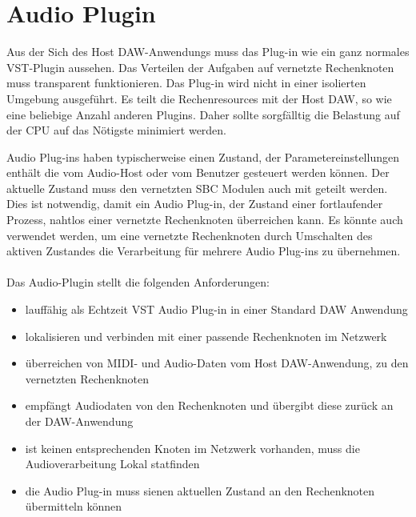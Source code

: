 \section{Audio Plugin}

Aus der Sich des Host DAW-Anwendungs muss das Plug-in wie ein ganz normales VST-Plugin aussehen. Das Verteilen der Aufgaben auf vernetzte Rechenknoten muss transparent funktionieren. Das Plug-in wird nicht in einer isolierten Umgebung ausgeführt. Es teilt die Rechenresources mit der Host DAW, so wie eine beliebige Anzahl anderen Plugins. Daher sollte sorgfälltig die Belastung auf der CPU auf das Nötigste minimiert werden.

Audio Plug-ins haben typischerweise einen Zustand, der Parametereinstellungen enthält die vom Audio-Host oder vom Benutzer gesteuert werden können. Der aktuelle Zustand muss den vernetzten SBC Modulen auch mit geteilt werden. Dies ist notwendig, damit ein Audio Plug-in, der Zustand einer fortlaufender Prozess, nahtlos einer vernetzte Rechenknoten überreichen kann. Es könnte auch verwendet werden, um eine vernetzte Rechenknoten durch Umschalten des aktiven Zustandes die Verarbeitung für mehrere Audio Plug-ins zu übernehmen.\\
\\
\noindent
Das Audio-Plugin stellt die folgenden Anforderungen:

\begin{itemize}

\item lauffähig als Echtzeit VST Audio Plug-in in einer Standard DAW Anwendung
\item lokalisieren und verbinden mit einer passende Rechenknoten im Netzwerk
\item überreichen von MIDI- und Audio-Daten vom Host DAW-Anwendung, zu den vernetzten Rechenknoten
\item empfängt Audiodaten von den Rechenknoten und übergibt diese zurück an der DAW-Anwendung
\item ist keinen entsprechenden Knoten im Netzwerk vorhanden, muss die Audioverarbeitung Lokal statfinden
\item die Audio Plug-in muss sienen aktuellen Zustand an den Rechenknoten übermitteln können

\end{itemize}